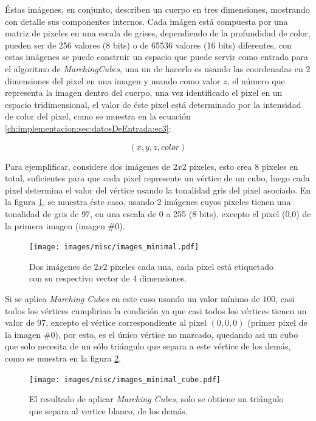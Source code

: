 Éstas imágenes, en conjunto, describen un cuerpo en tres dimensiones, mostrando con detalle sus componentes internos. Cada imágen está compuesta por una matriz de pixeles en una escala de grises, dependiendo de la profundidad de color, pueden ser de 256 valores (8 bits) o de 65536 valores (16 bits) diferentes, con estas imágenes se puede construir un espacio que puede servir como entrada para el algoritmo de \emph{MarchingCubes}, una un de hacerlo es usando las coordenadas en 2 dimensiones del pixel en una imagen y usando como valor $z$, el número que representa la imagen dentro del cuerpo, una vez identificado el pixel en un espacio tridimensional, el valor de éste pixel está determinado por la intensidad de color del pixel, como se muestra en la ecuación \ref{ch:implementacion:sec:datosDeEntrada:ec3}:

\begin{equation}
\label{ch:implementacion:sec:datosDeEntrada:ec3}
	(x,y,z,color)
\end{equation}

Para ejemplificar, considere dos imágenes de $2x2$ pixeles, esto crea 8 pixeles en total, suficientes para que cada pixel represente un vértice de un cubo, luego cada pixel determina el valor del vértice usando la tonalidad gris del pixel asociado. En la figura \ref{f:implementacion:images_minimal}, se muestra éste caso, usando 2 imágenes cuyos pixeles tienen una tonalidad de gris de 97, en una escala de 0 a 255 (8 bits), excepto el pixel (0,0) de la primera imagen (imagen \#0).

\begin{figure}[!hbt]
	\centering
	\texttt{[image: images/misc/images\_minimal.pdf]}
	\caption{Dos imágenes de $2x2$ pixeles cada una, cada pixel está etiquetado con su respectivo vector de 4 dimensiones.}
	\label{f:implementacion:images_minimal}
\end{figure}

Si se aplica \emph{Marching Cubes} en este caso usando un valor mínimo de $100$, casi todos los vértices cumplirian la condición ya que casi todos los vértices tienen un valor de $97$, excepto el vértice correspondiente al pixel $(0,0,0)$ (primer pixel de la imagen \#0), por esto, es el único vértice no marcado, quedando asi un cubo que solo necesita de un sólo triángulo que separa a este vértice de los demás, como se muestra en la figura \ref{f:implementacion:images_minimal_cube}.

\begin{figure}[!hbt]
	\centering
	\texttt{[image: images/misc/images\_minimal\_cube.pdf]}
	\caption{El resultado de aplicar \emph{Marching Cubes}, solo se obtiene un triángulo que separa al vertice blanco, de los demás.}
	\label{f:implementacion:images_minimal_cube}
\end{figure}

